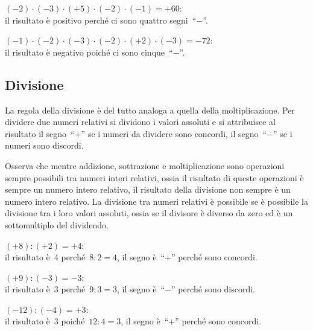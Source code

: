  \begin{esempio}{}{}
\((-2)\cdot (-3)\cdot (+5)\cdot (-2)\cdot (-1) = +60\): \\ 
il risultato è positivo perché ci sono quattro segni~``\(-\)''.
 \end{esempio}

 \begin{esempio}{}{}
\((-1)\cdot (-2)\cdot (-3)\cdot (-2)\cdot (+2)\cdot (-3) = -72\): \\ 
il risultato è negativo poiché ci sono cinque~``\(-\)''.
 \end{esempio}


\subsection{Divisione}

La regola della divisione è del tutto analoga a quella della 
moltiplicazione.
Per dividere due numeri relativi si dividono i valori assoluti e si 
attribuisce
al risultato il segno~``\(+\)'' se i numeri da dividere sono concordi, il 
segno~``\(-\)'' se i numeri sono discordi.

Osserva che mentre addizione, sottrazione e moltiplicazione sono operazioni 
sempre possibili
tra numeri interi relativi, ossia il risultato di queste operazioni è 
sempre un 
numero intero
relativo, il risultato della divisione non sempre è un numero intero 
relativo. 
La divisione
tra numeri relativi è possibile se è possibile la divisione tra i loro 
valori 
assoluti, ossia se
il divisore è diverso da zero ed è un sottomultiplo del dividendo.
 \begin{esempio}{}{}
\((+8):(+2)=+4\): \\
il risultato è~4 perché~\(8:2=4\), il segno è~``\(+\)'' perché sono 
concordi.
 \end{esempio}

\begin{esempio}{}{}
\((+9):(-3)=-3\): \\ 
il risultato è~3 perché~\(9:3=3\), il segno è~``\(-\)'' perché sono 
discordi.
 \end{esempio}

\begin{esempio}{}{}
\((-12):(-4)=+3\): \\
il risultato è~3 poiché~\(12:4=3\), il segno è~``\(+\)'' perché sono 
concordi.
 \end{esempio}

